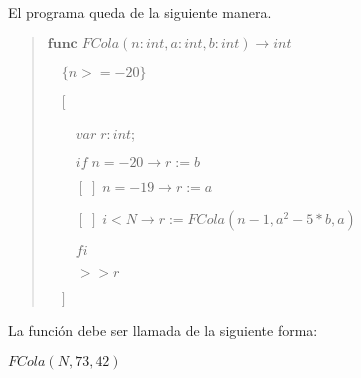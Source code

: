 \documentclass[hidelinks]{article}
\newenvironment{absolutelynopagebreak}
{\Needspace{10\baselineskip}\begin{quote}}
		{\end{quote}}
\begin{document}
El programa queda de la siguiente manera.\par

\begin{absolutelynopagebreak}
	$\textbf{func} \; FCola(n: int, a: int, b: int) \rightarrow int$ \par
	$\quad \{n >= -20 \}$\par
	$\quad [$\par
		$\qquad var \; r: int$;\par
		$\qquad if \; n = -20 \rightarrow r := b$\par
		$\qquad [\;] \; n = -19 \rightarrow r := a$\par
		$\qquad [\;] \; i < N \rightarrow r := FCola(n - 1, a^2 - 5 * b, a)$\par
		$\qquad fi$\par
		$\qquad >> r$\par
	$\quad ]$\par
\end{absolutelynopagebreak}\par

La función debe ser llamada de la siguiente forma:\par

\begin{center}
$FCola(N, 73, 42)$
\end{center}

\newpage
\end{document}
